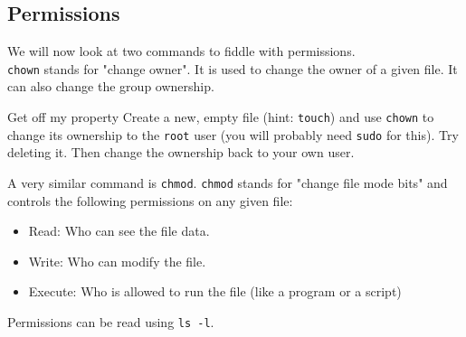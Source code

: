 \documentclass{TheAlternativeCourse}
\begin{document}
\subsection{Permissions}

We will now look at two commands to fiddle with permissions.\\

\texttt{chown} stands for "change owner". It is used to change the owner of a given file. It can also change the group ownership.

\begin{exercisebox}{Get off my property}
	Create a new, empty file (hint: \texttt{touch}) and use \texttt{chown} to change its ownership to the \texttt{root} user (you will probably need \texttt{sudo} for this). Try deleting it. Then change the ownership back to your own user.
\end{exercisebox}

A very similar command is \texttt{chmod}. \texttt{chmod} stands for "change file mode bits" and controls the following permissions on any given file:
\begin{itemize}
	\item Read: Who can see the file data.
	\item Write: Who can modify the file.
	\item Execute: Who is allowed to run the file (like a program or a script)
\end{itemize}

\begin{hintbox}
	Permissions can be read using \texttt{ls -l}.
\end{hintbox}
\end{document}
